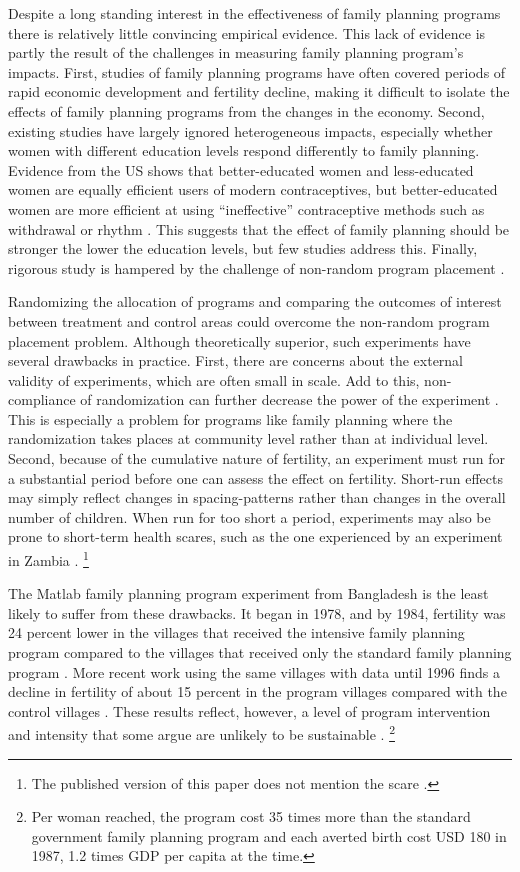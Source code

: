 \documentclass[letterpaper,12pt]{article}
\begin{document}
Despite a long standing interest in the effectiveness of family planning
programs there is relatively little convincing empirical evidence.
This lack of evidence is partly the result of the challenges in measuring 
family planning program's impacts.
First, studies of family planning programs have often covered periods of 
rapid economic development and fertility decline, making it difficult to
isolate the effects of family planning programs from the changes in the
economy.
Second, existing studies have largely ignored heterogeneous impacts,
especially whether women with different education levels respond
differently to family planning.
Evidence from the US shows that better-educated women and less-educated
women are equally efficient users of modern contraceptives, but
better-educated women are more efficient at using ``ineffective'' 
contraceptive methods such as withdrawal or rhythm \citep{Rosenzweig1989}.
This suggests that the effect of family planning should be stronger the 
lower the education levels, but few studies address this.
Finally, rigorous study is hampered by the challenge of non-random program 
placement \citep{rosenzweig86,pitt93}.


Randomizing the allocation of programs and comparing the outcomes of 
interest between treatment and control areas could overcome the non-random 
program placement problem.
Although theoretically superior, such experiments have several drawbacks in practice.
First, there are concerns about the external validity of experiments, which
are often small in scale.
Add to this, non-compliance of randomization can further decrease
the power of the experiment \citep{Desai2011}.
This is especially a problem for programs like family planning where the 
randomization takes places at community level rather than at individual level.
Second, because of the cumulative nature of fertility, an experiment must 
run for a substantial period before one can assess the effect on 
fertility.
Short-run effects may simply reflect changes in spacing-patterns rather than
changes in the overall number of children.
When run for too short a period, experiments may also be prone to short-term 
health scares, such as the one experienced by an experiment in 
Zambia \citep{Ashraf2009}.%
\footnote{
The published version of this paper does not mention the scare \citep{Ashraf2014}.
}

The Matlab family planning program experiment from Bangladesh is the
least likely to suffer from these drawbacks.
It began in 1978, and by 1984, fertility was 24 percent lower in the 
villages that received the intensive family planning program compared to the villages 
that received only the standard family planning program \citep{Phillips1988}.
More recent work using the same villages with data until 1996 finds a decline in fertility
of about 15 percent in the program villages compared with the control villages 
\citep{Sinha2005,Joshi2007}.
These results reflect, however, a level of program intervention and intensity
that some argue are unlikely to be sustainable \citep{pritchett94a}.%
\footnote{
Per woman reached, the program cost 35 times more than the standard government family 
planning program and each averted birth cost USD 180 in 1987, 1.2 times GDP per capita 
at the time.
}
\end{document}
